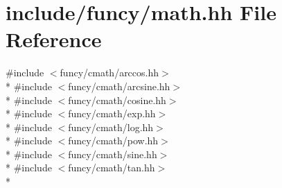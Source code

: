 \hypertarget{math_8hh}{\section{include/funcy/math.hh File Reference}
\label{math_8hh}
}
{\ttfamily \#include $<$funcy/cmath/arccos.\-hh$>$}\\*
{\ttfamily \#include $<$funcy/cmath/arcsine.\-hh$>$}\\*
{\ttfamily \#include $<$funcy/cmath/cosine.\-hh$>$}\\*
{\ttfamily \#include $<$funcy/cmath/exp.\-hh$>$}\\*
{\ttfamily \#include $<$funcy/cmath/log.\-hh$>$}\\*
{\ttfamily \#include $<$funcy/cmath/pow.\-hh$>$}\\*
{\ttfamily \#include $<$funcy/cmath/sine.\-hh$>$}\\*
{\ttfamily \#include $<$funcy/cmath/tan.\-hh$>$}\\*
